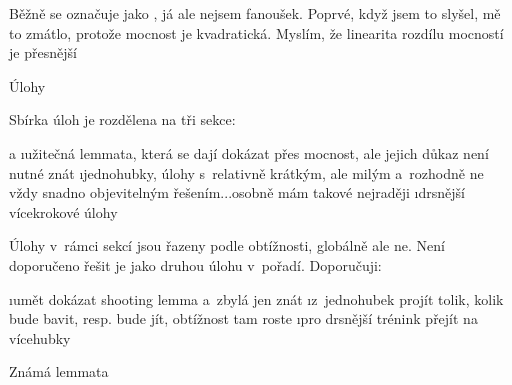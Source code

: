 Běžně se označuje jako , já ale nejsem fanoušek. Poprvé, když jsem to slyšel, mě to zmátlo, protože mocnost je kvadratická. Myslím, že linearita rozdílu mocností je přesnější \Laugh{}

\sec Úlohy

Sbírka úloh je rozdělena na tři sekce:

\begitems \style a
\i užitečná lemmata, která se dají dokázat přes mocnost, ale jejich důkaz není nutné znát
\i jednohubky, úlohy s~relativně krátkým, ale milým a~rozhodně ne vždy snadno objevitelným řešením...osobně mám takové nejraději
\i drsnější vícekrokové úlohy
\enditems

Úlohy v~rámci sekcí jsou řazeny podle obtížnosti, globálně ale ne. Není doporučeno řešit je jako druhou úlohu v~pořadí. Doporučuji:

\begitems
\i umět dokázat shooting lemma a~zbylá jen znát
\i z~jednohubek projít tolik, kolik bude bavit, resp. bude jít, obtížnost tam roste
\i pro drsnější trénink přejít na vícehubky
\enditems

\secc Známá lemmata

